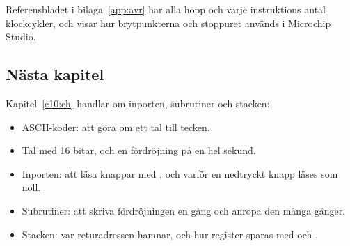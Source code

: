 Referensbladet i bilaga~\ref{app:avr} har alla hopp och varje instruktions antal klockcykler, och
 visar hur brytpunkterna och stoppuret används i Microchip Studio.

\subsection*{Nästa kapitel}
Kapitel~\ref{c10:ch} handlar om inporten, subrutiner och stacken:
\begin{itemize}
  \item ASCII-koder: att göra om ett tal till tecken.
  \item Tal med 16 bitar, och en fördröjning på en hel sekund.
  \item Inporten: att läsa knappar med , och varför en nedtryckt knapp läses som noll.
  \item Subrutiner: att skriva fördröjningen en gång och anropa den många gånger.
  \item Stacken: var returadressen hamnar, och hur register sparas med  och .
\end{itemize}
